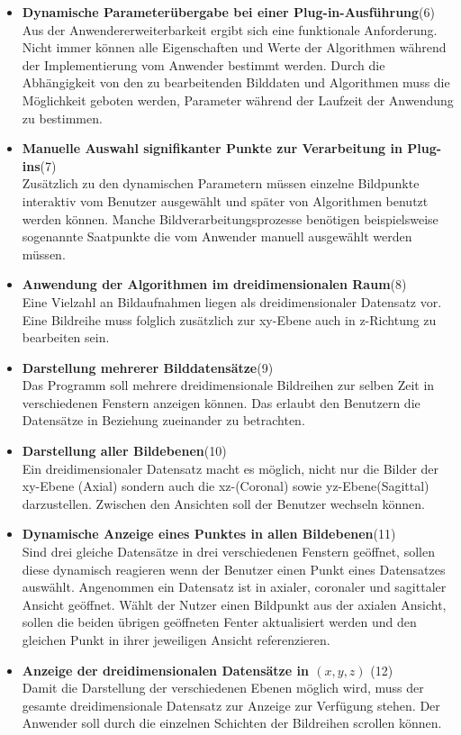 \begin{itemize}
\item \textbf{Dynamische Parameterübergabe bei einer Plug-in-Ausführung}(6)\\
		Aus der Anwendererweiterbarkeit ergibt sich eine funktionale Anforderung. Nicht immer können alle Eigenschaften und Werte der Algorithmen während der Implementierung vom Anwender bestimmt werden. Durch die Abhängigkeit von den zu bearbeitenden Bilddaten und Algorithmen muss die Möglichkeit geboten werden, Parameter während der Laufzeit der Anwendung zu bestimmen.

\item \textbf{Manuelle Auswahl signifikanter Punkte zur Verarbeitung in Plug-ins}(7)\\
		Zusätzlich zu den dynamischen Parametern müssen einzelne Bildpunkte interaktiv vom Benutzer ausgewählt und später von Algorithmen benutzt werden können. Manche Bildverarbeitungsprozesse benötigen beispielsweise sogenannte Saatpunkte die vom Anwender manuell ausgewählt werden müssen.

\item \textbf{Anwendung der Algorithmen im dreidimensionalen Raum}(8)\\
	  Eine Vielzahl an Bildaufnahmen liegen als dreidimensionaler Datensatz vor. Eine Bildreihe muss folglich zusätzlich zur xy-Ebene auch in z-Richtung zu bearbeiten sein.

\item \textbf{Darstellung mehrerer Bilddatensätze}(9)\\
	Das Programm soll mehrere dreidimensionale Bildreihen zur selben Zeit in verschiedenen Fenstern anzeigen können. Das erlaubt den Benutzern die Datensätze in Beziehung zueinander zu betrachten.

\item \textbf{Darstellung aller Bildebenen}(10)\\
	  Ein dreidimensionaler Datensatz macht es möglich, nicht nur die Bilder der xy-Ebene (Axial) sondern auch die xz-(Coronal) sowie yz-Ebene(Sagittal) darzustellen. Zwischen den Ansichten soll der Benutzer wechseln können.

\item \textbf{Dynamische Anzeige eines Punktes in allen Bildebenen}(11)\\
	  Sind drei gleiche Datensätze in drei verschiedenen Fenstern geöffnet, sollen diese dynamisch reagieren wenn der Benutzer einen Punkt eines Datensatzes auswählt. Angenommen ein Datensatz ist in axialer, coronaler und sagittaler Ansicht geöffnet. Wählt der Nutzer einen Bildpunkt aus der axialen Ansicht, sollen die beiden übrigen geöffneten Fenter aktualisiert werden und den gleichen Punkt in ihrer jeweiligen Ansicht referenzieren.
	  
\item \textbf{Anzeige der dreidimensionalen Datensätze in $(x, y, z)$} (12)\\
	 Damit die Darstellung der verschiedenen Ebenen möglich wird, muss der gesamte dreidimensionale Datensatz zur Anzeige zur Verfügung stehen. Der Anwender soll durch die einzelnen Schichten der Bildreihen scrollen können.
\end{itemize}
